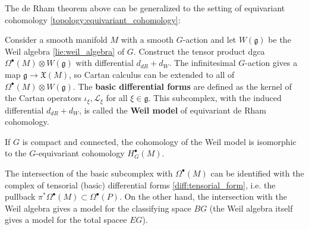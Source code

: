 
    The de Rham theorem above can be generalized to the setting of equivariant cohomology \ref{topology:equivariant_cohomology}:
    \begin{property}
        Consider a smooth manifold $M$ with a smooth $G$-action and let $W(\mathfrak{g})$ be the Weil algebra \ref{lie:weil_algebra} of $G$. Construct the tensor product dgca $\Omega^\bullet(M)\otimes W(\mathfrak{g})$ with differential $d_{dR}+d_W$. The infinitesimal $G$-action gives a map $\mathfrak{g}\rightarrow\mathfrak{X}(M)$, so Cartan calculus can be extended to all of $\Omega^\bullet(M)\otimes W(\mathfrak{g})$. The \textbf{basic differential forms} are defined as the kernel of the Cartan operators $\iota_\xi,\mathcal{L}_\xi$ for all $\xi\in\mathfrak{g}$. This subcomplex, with the induced differential $d_{dR}+d_W$, is called the \textbf{Weil model} of equivariant de Rham cohomology.

        If $G$ is compact and connected, the cohomology of the Weil model is isomorphic to the $G$-equivariant cohomology $H_G^\bullet(M)$.
    \end{property}
    \begin{property}
        The intersection of the basic subcomplex with $\Omega^\bullet(M)$ can be identified with the complex of tensorial (basic) differential forms \ref{diff:tensorial_form}, i.e. the pullback $\pi^*\Omega^\bullet(M)\subset\Omega^\bullet(P)$. On the other hand, the intersection with the Weil algebra gives a model for the classifying space $BG$ (the Weil algebra itself gives a model for the total spacee $EG$).
    \end{property}

